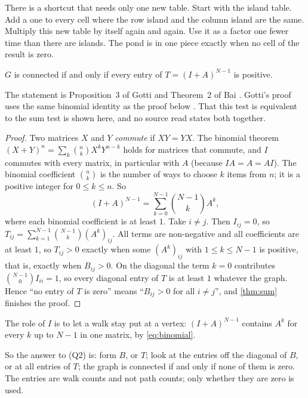 \plainwords{} There is a shortcut that needs only one new table. Start with
the island table. Add a one to every cell where the row island and the
column island are the same. Multiply this new table by itself again and
again. Use it as a factor one fewer time than there are islands. The pond
is in one piece exactly when no cell of the result is zero.

\begin{theorem}\label{thm:power}
$G$ is connected if and only if every entry of $T=(I+A)^{N-1}$ is positive.
\end{theorem}
The statement is Proposition~3 of Gotti \cite[p.~2]{gotti18211} and
Theorem~2 of Bai \cite[p.~1]{bai2025adjacency}. Gotti's proof uses the same
binomial identity as the proof below \cite[p.~2]{gotti18211}. That this
test is equivalent to the sum test is shown here, and no source read states
both together.
\begin{proof}
Two matrices $X$ and $Y$ \emph{commute} if $XY=YX$. The binomial theorem
$(X+Y)^n=\sum_k\binom nk X^kY^{n-k}$ holds for matrices that commute, and
$I$ commutes with every matrix, in particular with $A$ (because
$IA=A=AI$). The binomial coefficient $\binom{n}{k}$ is the number of ways
to choose $k$ items from $n$; it is a positive integer for $0\le k\le n$.
So
\begin{equation}\label{eq:binomial}
(I+A)^{N-1}=\sum_{k=0}^{N-1}\binom{N-1}{k}A^k,
\end{equation}
where each binomial coefficient is at least $1$. Take $i\ne j$.
Then $I_{ij}=0$, so $T_{ij}=\sum_{k=1}^{N-1}\binom{N-1}{k}(A^k)_{ij}$. All
terms are non-negative and all coefficients are at least $1$, so $T_{ij}>0$
exactly when some $(A^k)_{ij}$ with $1\le k\le N-1$ is positive, that is,
exactly when $B_{ij}>0$. On the diagonal the term $k=0$ contributes
$\binom{N-1}{0}I_{ii}=1$, so every diagonal entry of $T$ is at least $1$
whatever the graph. Hence ``no entry of $T$ is zero'' means ``$B_{ij}>0$ for
all $i\ne j$'', and \cref{thm:sum} finishes the proof.
\end{proof}

The role of $I$ is to let a walk stay put at a vertex: $(I+A)^{N-1}$
contains $A^k$ for every $k$ up to $N-1$ in one matrix, by
\cref{eq:binomial}.

So the answer to (Q2) is: form $B$, or $T$; look at the entries off the
diagonal of $B$, or at all entries of $T$; the graph is connected if and
only if none of them is zero. The entries are walk counts and not path
counts; only whether they are zero is used.

